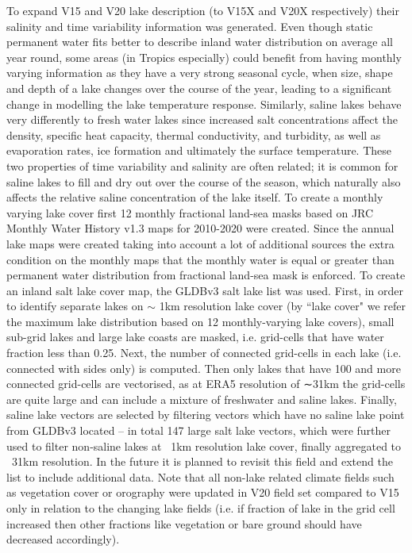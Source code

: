 \documentclass[hess, twostagejnl]{copernicus}
\begin{document}
To expand V15 and V20 lake description (to V15X and V20X respectively) their salinity and time variability information was generated. Even though static permanent water fits better to describe inland water distribution on average all year round, some areas (in Tropics especially) could  benefit from having monthly varying information as they have a very strong seasonal cycle, when size, shape and depth of a lake changes over the course of the year, leading to a significant change in modelling the lake temperature response. Similarly, saline lakes behave very differently to fresh water lakes since increased salt concentrations affect the density, specific heat capacity, thermal conductivity, and turbidity, as well as evaporation rates, ice formation and ultimately the surface temperature. These two properties of time variability and salinity are often related; it is common for saline lakes to fill and dry out over the course of the season, which naturally also affects the relative saline concentration of the lake itself. To create a monthly varying lake cover first 12 monthly fractional land-sea masks based on JRC Monthly Water History v1.3 maps for 2010-2020 were created. Since the annual lake maps were created taking into account a lot of additional sources the extra condition on the monthly maps that the monthly water is equal or greater than permanent water distribution from fractional land-sea mask is enforced. To create an inland salt lake cover map, the GLDBv3 salt lake list was used. First, in order to identify separate lakes on $\sim$ 1km resolution lake cover (by ``lake cover" we refer the maximum lake distribution based on 12 monthly-varying lake covers), small sub-grid lakes and large lake coasts are masked, i.e. grid-cells that have water fraction less than 0.25. Next, the number of connected grid-cells in each lake (i.e. connected with sides only) is computed. Then only lakes that have 100 and more connected grid-cells are vectorised, as at ERA5 resolution of ∼31km the grid-cells are quite large and can include a mixture of freshwater and saline lakes. Finally, saline lake vectors are selected by filtering vectors which have no saline lake point from GLDBv3 located – in total 147 large salt lake vectors, which were further used to filter non-saline lakes at ~1km resolution lake cover, finally aggregated to ~31km resolution. In the future it is planned to revisit this field and extend the list to include additional data. Note that all non-lake related climate fields such as vegetation cover or orography were updated in V20 field set compared to V15 only in relation to the changing lake fields (i.e. if fraction of lake in the grid cell increased then other fractions like vegetation or bare ground should have decreased accordingly). 
\end{document}
